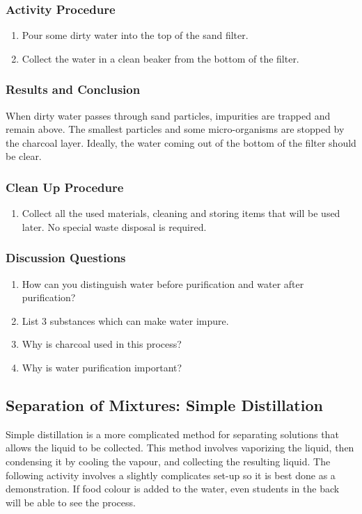 \subsubsection*{Activity Procedure}
\begin{enumerate}
\item{Pour some dirty water into the top of the sand filter.}
\item{Collect the water in a clean beaker from the bottom of the filter.}
\end{enumerate}

\subsubsection*{Results and Conclusion}
When dirty water passes through sand particles, impurities are trapped and remain above. The smallest particles and some micro-organisms are stopped by the charcoal layer. Ideally, the water coming out of the bottom of the filter should be clear. 

\subsubsection*{Clean Up Procedure}
\begin{enumerate}
\item{Collect all the used materials, cleaning and storing items that will be used later. No special waste disposal is required.}
\end{enumerate}

\subsubsection*{Discussion Questions}
\begin{enumerate}
\item{How can you distinguish water before purification and water after purification?}
\item{List 3 substances which can make water impure.}
\item{Why is charcoal used in this process?}
\item{Why is water purification important?}
\end{enumerate}


\subsection{Separation of Mixtures: Simple Distillation}
Simple distillation is a more complicated method for separating solutions that allows the liquid to be collected. This method involves vaporizing the liquid, then condensing it by cooling the vapour, and collecting the resulting liquid.  The following activity involves a slightly complicates set-up so it is best done as a demonstration. If food colour is added to the water, even students in the back will be able to see the process.
